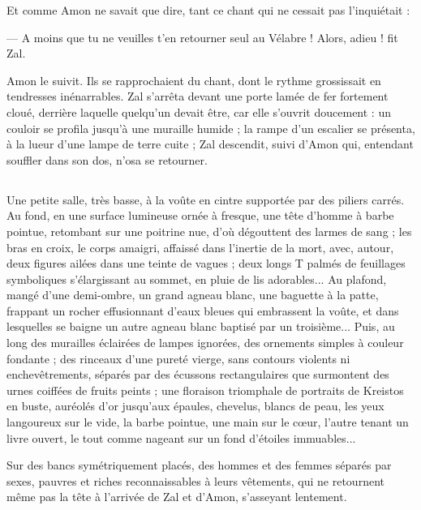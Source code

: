 \documentclass[a4paper, 11pt, oneside, polutonikogreek, french]{article}
\begin{document}
Et comme Amon ne savait que dire, tant ce chant qui ne cessait pas l'inquiétait :

--- A moins que tu ne veuilles t'en retourner seul au Vélabre ! Alors, adieu ! fit Zal.

Amon le suivit. Ils se rapprochaient du chant, dont le rythme grossissait en tendresses inénarrables. Zal s'arrêta devant une porte lamée de fer fortement cloué, derrière laquelle quelqu'un devait être, car elle s'ouvrit doucement : un couloir se profila jusqu'à une muraille humide ; la rampe d'un escalier se présenta, à la lueur d'une lampe de terre cuite ; Zal descendit, suivi d'Amon qui, entendant souffler dans son dos, n'osa se retourner.
\clearpage
\subsection{}
\paragraph{}
Une petite salle, très basse, à la voûte en cintre supportée par des piliers carrés. Au fond, en une surface lumineuse ornée à fresque, une tête d'homme à barbe pointue, retombant sur une poitrine nue, d'où dégouttent des larmes de sang ; les bras en croix, le corps amaigri, affaissé dans l'inertie de la mort, avec, autour, deux figures ailées dans une teinte de vagues ; deux longs T palmés de feuillages symboliques s'élargissant au sommet, en pluie de lis adorables... Au plafond, mangé d'une demi-ombre, un grand agneau blanc, une baguette à la patte, frappant un rocher effusionnant d'eaux bleues qui embrassent la voûte, et dans lesquelles se baigne un autre agneau blanc baptisé par un troisième... Puis, au long des murailles éclairées de lampes ignorées, des ornements simples à couleur fondante ; des rinceaux d'une pureté vierge, sans contours violents ni enchevêtrements, séparés par des écussons rectangulaires que surmontent des urnes coiffées de fruits peints ; une floraison triomphale de portraits de Kreistos en buste, auréolés d'or jusqu'aux épaules, chevelus, blancs de peau, les yeux langoureux sur le vide, la barbe pointue, une main sur le cœur, l'autre tenant un livre ouvert, le tout comme nageant sur un fond d'étoiles immuables...

Sur des bancs symétriquement placés, des hommes et des femmes séparés par sexes, pauvres et riches reconnaissables à leurs vêtements, qui ne retournent même pas la tête à l'arrivée de Zal et d'Amon, s'asseyant lentement.
\end{document}
